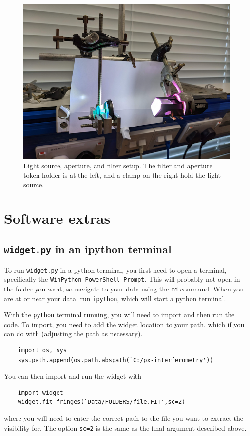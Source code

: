 \documentclass[11pt]{article}
\begin{document}
\begin{figure}[h]
    \centering
    \includegraphics[width=1\textwidth]{doc/source.png}
    \caption{Light source, aperture, and filter setup. The filter and aperture token holder is at the left, and a clamp on the right hold the light source.}
    \label{fig:source}
\end{figure}

\clearpage

\section{Software extras}

\subsection{\texttt{widget.py} in an ipython terminal}\label{sec:widget_ipython}

To run \texttt{widget.py} in a python terminal, you first need to open a terminal, specifically the \texttt{WinPython PowerShell Prompt}. This will probably not open in the folder you want, so navigate to your data using the \texttt{cd} command. When you are at or near your data, run \texttt{ipython}, which will start a python terminal.

With the \texttt{python} terminal running, you will need to import and then run the code. To import, you need to add the widget location to your path, which if you can do with (adjusting the path as necessary).
\begin{verbatim}
    import os, sys
    sys.path.append(os.path.abspath(`C:/px-interferometry'))
\end{verbatim}
You can then import and run the widget with
\begin{verbatim}
    import widget
    widget.fit_fringes(`Data/FOLDERS/file.FIT',sc=2)
\end{verbatim}
where you will need to enter the correct path to the file you want to extract the visibility for. The option \texttt{sc=2} is the same as the final argument described above.
\end{document}
